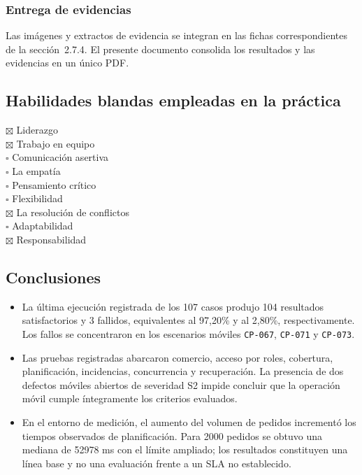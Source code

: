 \documentclass[11pt]{article}
\let\oldtexttt\texttt
\renewcommand{\texttt}[1]{\oldtexttt{\hyphenchar\font=45\relax #1}}
\renewcommand{\_}{\textunderscore\allowbreak}
\begin{document}
\subsubsection{Entrega de evidencias}
Las imágenes y extractos de evidencia se integran en las fichas correspondientes de la
sección~2.7.4. El presente documento consolida los resultados y las evidencias en un único PDF.

\clearpage
\subsection{Habilidades blandas empleadas en la práctica}
 $\boxtimes$ Liderazgo \\
 $\boxtimes$ Trabajo en equipo \\
 $\square$ Comunicación asertiva \\
 $\square$ La empatía \\
 $\square$ Pensamiento crítico \\
 $\square$ Flexibilidad \\
 $\boxtimes$ La resolución de conflictos \\
 $\square$ Adaptabilidad \\
 $\boxtimes$ Responsabilidad \\

\subsection{Conclusiones}
\begin{itemize}
    \item La última ejecución registrada de los 107 casos produjo 104 resultados satisfactorios y 3 fallidos, equivalentes al 97,20\% y al 2,80\%, respectivamente. Los fallos se concentraron en los escenarios móviles \texttt{CP-067}, \texttt{CP-071} y \texttt{CP-073}.
    \item Las pruebas registradas abarcaron comercio, acceso por roles, cobertura, planificación, incidencias, concurrencia y recuperación. La presencia de dos defectos móviles abiertos de severidad S2 impide concluir que la operación móvil cumple íntegramente los criterios evaluados.
    \item En el entorno de medición, el aumento del volumen de pedidos incrementó los tiempos observados de planificación. Para 2000 pedidos se obtuvo una mediana de 52978 ms con el límite ampliado; los resultados constituyen una línea base y no una evaluación frente a un SLA no establecido.
\end{itemize}
\end{document}
